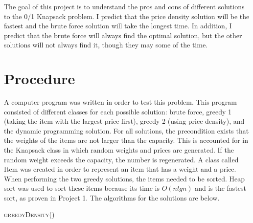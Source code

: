 \documentclass[onecolumn, letterpaper, 12pt]{article}
\begin{document}
The goal of this project is to understand the pros and cons of different solutions to the 0/1 Knapsack problem. I predict that the price density solution will be the fastest and the brute force solution will take the longest time. In addition, I predict that the brute force will always find the optimal solution, but  the other solutions will not always find it, though they may some of the time.


\section{Procedure}
A computer program was written in order to test this problem. This program consisted of different classes for each possible solution: brute force, greedy 1 (taking the item with the largest price first), greedy 2 (using price density), and the dynamic programming solution. For all solutions, the precondition exists that the weights of the items are not larger than the capacity. This is accounted for in the Knapsack class in which random weights and prices are generated. If the random weight exceeds the capacity, the number is regenerated. A class called Item was created in order to represent an item that has a weight and a price. When performing the two greedy solutions, the items needed to be sorted. Heap sort was used to sort these items because its time is $O(nlgn)$ and is the fastest sort, as proven in Project 1. The algorithms for the solutions are below.

\begin{algorithm}[H]
\caption {\textsc{greedyDensity}()}
\label{greedyDensityps}
\begin{algorithmic}[1]

\EndFor
{}
\EndIf
\EndFor

\EndProcedure
\end{algorithmic}
\end{algorithm}
\end{document}
